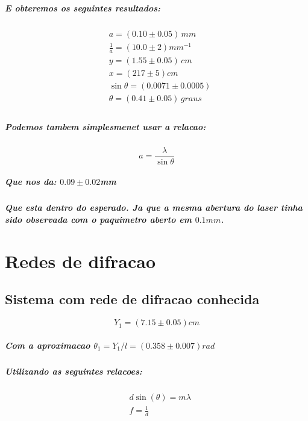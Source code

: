 \documentclass[12pt,twoside, a4paper, twocolumn]{article}
\begin{document}
\subparagraph*{E obteremos os seguintes resultados:}

\begin{equation}
  \begin{aligned}
     & a =(0.10 \pm 0.05)\,mm             \\
     & \frac{1}{a} = (10.0 \pm 2)mm^{-1}  \\
     & y = (1.55 \pm 0.05)\,cm            \\
     & x = (217 \pm 5)cm                  \\
     & \sin{\theta} = (0.0071 \pm 0.0005) \\
     & \theta = (0.41 \pm 0.05)\,graus    \\
  \end{aligned}
\end{equation}

\subparagraph*{Podemos tambem simplesmenet usar a relacao:}

\begin{equation}
  a = \frac{\lambda}{\sin{\theta}}
\end{equation}

\subparagraph*{Que nos da: $0.09 \pm 0.02$mm}

\subparagraph*{Que esta dentro do esperado. Ja que a mesma abertura do laser tinha sido observada com o paquimetro aberto em $0.1mm$.}

\newpage

\pagebreak

\section{Redes de difracao}

\subsection{Sistema com rede de difracao conhecida}

\begin{equation}
  Y_1 = (7.15 \pm 0.05)cm
\end{equation}


\subparagraph*{Com a aproximacao $\theta_1 = Y_1/l = (0.358 \pm 0.007)rad$}

\subparagraph*{Utilizando as seguintes relacoes:}

\begin{equation}
  \begin{aligned}
     & d \sin(\theta) = m \lambda \\
     & f = \frac{1}{d}            \\
  \end{aligned}
\end{equation}
\end{document}
